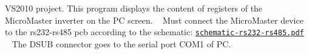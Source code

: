 \label{index_intro_sec}%
\hypertarget{index_intro_sec}{}%
V\+S2010 project. This program displays the content of registers of the Micro\+Master inverter on the P\+C screen. ~\newline
 Must connect the Micro\+Master device to the rs232-\/rs485 pcb according to the schematic\+: \href{../../hardware/schematic-rs232-rs485.pdf}{\tt schematic-\/rs232-\/rs485.\+pdf} ~\newline
 The D\+S\+U\+B connector goes to the serial port C\+O\+M1 of P\+C. 